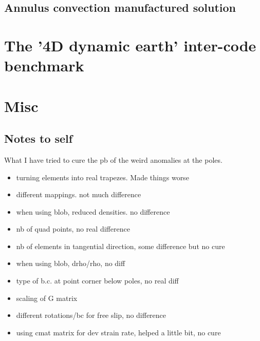 \documentclass[a4paper,12pt]{article}
\begin{document}
\subsection{Annulus convection manufactured solution}


\section{The '4D dynamic earth' inter-code benchmark}

\cite{krhb12}


\newpage
\appendix
\section{Misc}

\subsection{Notes to self}

What I have tried to cure the pb of the weird anomalies at the poles.

\begin{itemize}
\item turning elements into real trapezes. Made things worse
\item different mappings. not much difference
\item when using blob, reduced densities. no difference
\item nb of quad points, no real difference
\item nb of elements in tangential direction, some difference but no cure 
\item when using blob, drho/rho, no diff 
\item type of b.c. at point corner below poles, no real diff 
\item scaling of G matrix
\item different rotations/bc for free slip, no difference
\item using cmat matrix for dev strain rate, helped a little bit, no cure 
\end{itemize}



\end{document}

